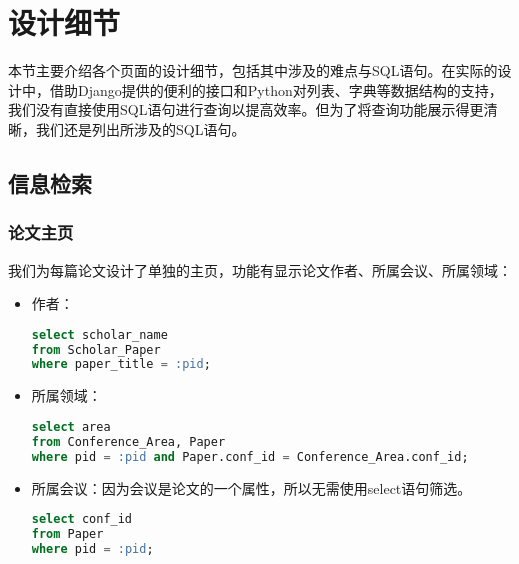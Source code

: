 
\section{设计细节}

本节主要介绍各个页面的设计细节，包括其中涉及的难点与SQL语句。在实际的设计中，借助Django提供的便利的接口和Python对列表、字典等数据结构的支持，我们没有直接使用SQL语句进行查询以提高效率。但为了将查询功能展示得更清晰，我们还是列出所涉及的SQL语句。

\subsection{信息检索}

\subsubsection{论文主页}
我们为每篇论文设计了单独的主页，功能有显示论文作者、所属会议、所属领域：
\begin{itemize}
\item 作者：
\begin{lstlisting}[language=SQL]
select scholar_name
from Scholar_Paper
where paper_title = :pid;
\end{lstlisting}
\item 所属领域：
\begin{lstlisting}[language=SQL]
select area
from Conference_Area, Paper
where pid = :pid and Paper.conf_id = Conference_Area.conf_id;
\end{lstlisting}
\item 所属会议：因为会议是论文的一个属性，所以无需使用select语句筛选。
\begin{lstlisting}[language=SQL]
select conf_id
from Paper
where pid = :pid;
\end{lstlisting}
\end{itemize}

